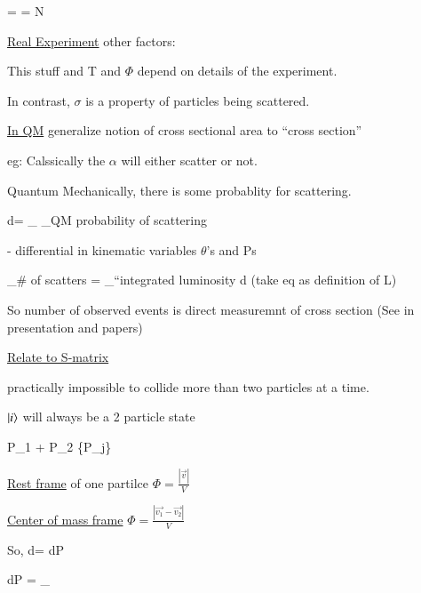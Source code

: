 {\be
\sigma =  =  N
\ee

\underline{Real Experiment}
other factors: 

This stuff and T and $\Phi$ depend on details of the experiment. 

In contrast, $\sigma$ is a property of particles being scattered. 

\underline{In QM} generalize notion of cross sectional area to ``cross section'' 

eg: Calssically the $\alpha$ will either scatter or not. 

Quantum Mechanically,  there is some probablity for scattering.

\be
d\sigma = _{} _{\textrm{QM probability of scattering}}
\ee

 - differential in kinematic variables $\theta$'s and Ps


\be
{}_{\# \textrm{of scatters}} = _{\textrm{``integrated luminosity}} \times d\sigma 
\ee
(take eq as definition of L)

So number of observed events is direct measuremnt of cross section (See in presentation and papers)


\underline{Relate to S-matrix}

practically impossible to collide more than two particles at a time.

$\ket{i}$ will always be a 2 particle state

\be
P_1 + P_2 \rightarrow \{P_j\}
\ee

\underline{Rest frame} of one partilce $\Phi = \frac{|\vec{v}|}{V}$

\underline{Center of mass frame}  $\Phi = \frac{|\vec{v_1} - \vec{v_2}|}{V}$


So, 
\be
d\sigma =  dP
\ee

\be
dP =  _{}
\ee

}


